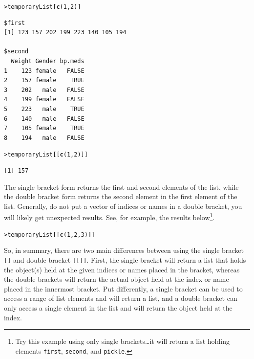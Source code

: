 \documentclass[12pt,oneside]{book}\usepackage[]{graphicx}\usepackage[]{color}
\makeatletter
\newcommand{\hlnum}[1]{\textcolor[rgb]{0.686,0.059,0.569}{#1}}%
\newcommand{\hlstd}[1]{\textcolor[rgb]{0.345,0.345,0.345}{#1}}%
\newcommand{\hlkwd}[1]{\textcolor[rgb]{0.737,0.353,0.396}{\textbf{#1}}}%
\newenvironment{kframe}{%
 \def\at@end@of@kframe{}%
 \ifinner\ifhmode%
  \def\at@end@of@kframe{\end{minipage}}%
  \begin{minipage}{\columnwidth}%
 \fi\fi%
 \def\FrameCommand##1{\hskip\@totalleftmargin \hskip-\fboxsep
 \colorbox{shadecolor}{##1}\hskip-\fboxsep
     \hskip-\linewidth \hskip-\@totalleftmargin \hskip\columnwidth}%
 \MakeFramed {\advance\hsize-\width
   \@totalleftmargin\z@ \linewidth\hsize
   \@setminipage}}%
 {\par\unskip\endMakeFramed%
 \at@end@of@kframe}
\newenvironment{knitrout}{}{} %
\makeatother
\begin{document}
\begin{knitrout}
\color{fgcolor}\begin{kframe}
\begin{alltt}
\hlstd{> }\hlstd{temporaryList[}\hlkwd{c}\hlstd{(}\hlnum{1}\hlstd{,} \hlnum{2}\hlstd{)]}
\end{alltt}
\begin{verbatim}
$first
[1] 123 157 202 199 223 140 105 194

$second
  Weight Gender bp.meds
1    123 female   FALSE
2    157 female    TRUE
3    202   male   FALSE
4    199 female   FALSE
5    223   male    TRUE
6    140   male   FALSE
7    105 female    TRUE
8    194   male   FALSE
\end{verbatim}
\begin{alltt}
\hlstd{> }\hlstd{temporaryList[[}\hlkwd{c}\hlstd{(}\hlnum{1}\hlstd{,} \hlnum{2}\hlstd{)]]}
\end{alltt}
\begin{verbatim}
[1] 157
\end{verbatim}
\end{kframe}
\end{knitrout}
The single bracket form returns the first and second elements of the list, while the double bracket form returns the second element in the first element of the list. Generally, do not put a vector of indices or names in a double bracket, you will likely get unexpected results. See, for example, the results below\footnote{Try this example using only single brackets\ldots it will return a list holding elements \texttt{first}, \texttt{second}, and \texttt{pickle}.}. 
\begin{knitrout}
\color{fgcolor}\begin{kframe}
\begin{alltt}
\hlstd{> }\hlstd{temporaryList[[}\hlkwd{c}\hlstd{(}\hlnum{1}\hlstd{,} \hlnum{2}\hlstd{,} \hlnum{3}\hlstd{)]]}
\end{alltt}


{\ttfamily\noindent\bfseries\color{errorcolor}{Error in temporaryList[[c(1, 2, 3)]]: recursive indexing failed at level 2}}\end{kframe}
\end{knitrout}

So, in summary, there are two main differences between using the single bracket \verb+[]+ and double bracket \verb+[[]]+. First, the single bracket will return a list that holds the object(s) held at the given indices or names placed in the bracket, whereas the double brackets will return the actual object held at the index or name placed in the innermost bracket. Put differently, a single bracket can be used to access a range of list elements and will return a list, and a double bracket can only access a single element in the list and will return the object held at the index.
\end{document}
